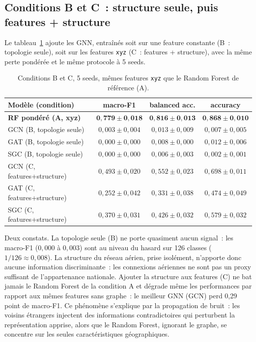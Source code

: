 \documentclass[french]{llncs}
\begin{document}
    \subsection{Conditions B et C~: structure seule, puis features + structure}

    Le tableau~\ref{tab:graph} ajoute les GNN, entraînés soit sur une feature constante
    (B~: topologie seule), soit sur les features \texttt{xyz} (C~: features + structure), avec
    la même perte pondérée et le même protocole à 5 seeds.

    \begin{table}[ht]
     \begin{center}
       \scriptsize
       \setlength{\tabcolsep}{4pt}
       \renewcommand{\arraystretch}{0.8}
       \begin{tabular}{l c c c}
       \toprule
       Modèle (condition) & macro-F1 & balanced acc. & accuracy \\
       \midrule
       \textbf{RF pondéré (A, xyz)} & $\mathbf{0,779 \pm 0,018}$ & $\mathbf{0,816 \pm 0,013}$ & $\mathbf{0,868 \pm 0,010}$ \\
       GCN (B, topologie seule)     & $0,003 \pm 0,004$ & $0,013 \pm 0,009$ & $0,007 \pm 0,005$ \\
       GAT (B, topologie seule)     & $0,000 \pm 0,000$ & $0,008 \pm 0,000$ & $0,012 \pm 0,006$ \\
       SGC (B, topologie seule)     & $0,000 \pm 0,000$ & $0,006 \pm 0,003$ & $0,002 \pm 0,001$ \\
       GCN (C, features+structure)  & $0,493 \pm 0,020$ & $0,552 \pm 0,023$ & $0,698 \pm 0,011$ \\
       GAT (C, features+structure)  & $0,252 \pm 0,042$ & $0,331 \pm 0,038$ & $0,474 \pm 0,049$ \\
       SGC (C, features+structure)  & $0,370 \pm 0,031$ & $0,426 \pm 0,032$ & $0,579 \pm 0,032$ \\
       \bottomrule
       \end{tabular}
      \caption{Conditions B et C, 5 seeds, mêmes features \texttt{xyz} que le Random Forest de référence (A).} \label{tab:graph}
     \end{center}
    \end{table}

    Deux constats. La topologie seule (B) ne porte quasiment aucun signal~: les macro-F1
    ($0,000$ à $0,003$) sont au niveau du hasard sur 126 classes ($1/126 \approx 0,008$).
    La structure du réseau aérien, prise isolément, n'apporte donc aucune information
    discriminante~: les connexions aériennes ne sont pas un proxy suffisant de l'appartenance
    nationale. Ajouter la structure aux features (C) ne bat jamais le Random Forest de la
    condition A et dégrade même les performances par rapport aux mêmes features sans graphe~:
    le meilleur GNN (GCN) perd 0,29 point de macro-F1. Ce phénomène s'explique par la
    propagation de bruit~: les voisins étrangers injectent des informations contradictoires
    qui perturbent la représentation apprise, alors que le Random Forest, ignorant le graphe,
    se concentre sur les seules caractéristiques géographiques.
\end{document}
